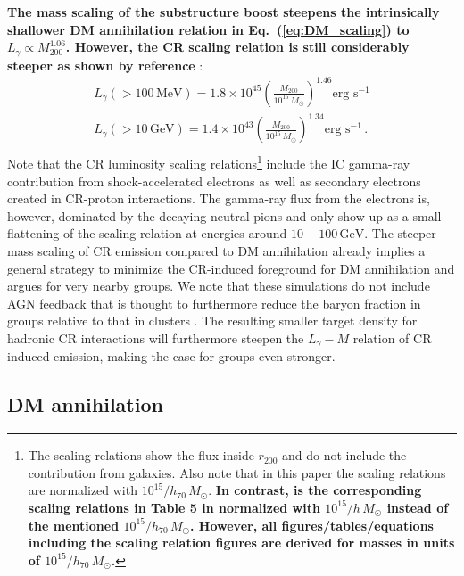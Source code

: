 \documentclass[10pt,aps,pra,reprint,amsmath,amsfonts,amssymb,showpacs,nofootinbib,floatfix]{revtex4-1}
\def\C#1{{\bf #1}}
\newcommand{\rmn}{\mathrm}
\newcommand{\msun}{M_\odot}
\newcommand{\mev}{\rmn{MeV}}
\newcommand{\gev}{\rmn{GeV}}
\newcommand{\rvir}{r_{200}}
\newcommand{\mvir}{M_{200}}
\begin{document}
\C{The mass scaling of the substructure boost steepens the
  intrinsically shallower DM annihilation relation in
  Eq.~(\ref{eq:DM_scaling}) to $L_\gamma\propto \mvir^{1.06}$.
  However, the CR scaling relation is still considerably steeper as
  shown by reference} \cite{2010MNRAS.409..449P}:
\begin{eqnarray}
L_{\gamma}(>100\,\mev) = 1.8\times10^{45}
\left(\frac{\mvir}{10^{15}\,\msun}\right)^{1.46}\mbox{erg~s}^{-1}\nonumber\\
L_{\gamma}(>10\,\gev)  = 1.4\times10^{43}
\left(\frac{\mvir}{10^{15}\,\msun}\right)^{1.34}\mbox{erg~s}^{-1}\,.\nonumber\\
\end{eqnarray}
Note that the CR luminosity scaling relations\footnote{The scaling
  relations show the flux inside $\rvir$ and do not include the
  contribution from galaxies. Also note that in this paper the scaling
  relations are normalized with $10^{15}/h_{70}\,\msun$. \C{In
    contrast, is the corresponding scaling relations in Table 5 in
    \cite{2010MNRAS.409..449P} normalized with $10^{15}/h\,\msun$
    instead of the mentioned $10^{15}/h_{70}\,\msun$. However, all
    figures/tables/equations including the scaling relation figures
    are derived for masses in units of $10^{15}/h_{70}\,\msun$.}}
include the IC gamma-ray contribution from shock-accelerated electrons
as well as secondary electrons created in CR-proton interactions. The
gamma-ray flux from the electrons is, however, dominated by the
decaying neutral pions and only show up as a small flattening of the
scaling relation at energies around $10-100\,\gev$. The steeper mass
scaling of CR emission compared to DM annihilation already implies a
general strategy to minimize the CR-induced foreground for DM
annihilation and argues for very nearby groups. We note that these
simulations do not include AGN feedback that is thought to furthermore
reduce the baryon fraction in groups relative to that in clusters
\cite{2008ApJ...687L..53P}. The resulting smaller target density for
hadronic CR interactions will furthermore steepen the $L_\gamma-M$
relation of CR induced emission, making the case for groups even
stronger.

\subsection{DM annihilation}
\end{document}
